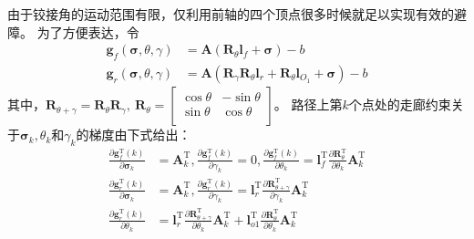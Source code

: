 \documentclass[master,academic]{ysuthesis} %
\begin{document}
		由于铰接角的运动范围有限，仅利用前轴的四个顶点很多时候就足以实现有效的避障。
		为了方便表达，令
		\begin{equation}
			\begin{aligned}
			\bm{g}_{f}\left( \bm{\sigma} ,\theta ,\gamma \right) &=\bm{A}\left( \bm{R}_{\theta}\bm{l}_f+\bm{\sigma} \right) -b\\
			\bm{g}_r\left( \bm{\sigma} ,\theta ,\gamma \right) &=\bm{A}\left( \bm{R}_{\gamma}\bm{R}_{\theta}\bm{l}_r+\bm{R}_{\theta}\bm{l}_{O_1}+\bm{\sigma} \right) -b
			\end{aligned}
		\end{equation}
		其中，$\bm{R}_{\theta +\gamma}=\bm{R}_{\theta}\bm{R}_{\gamma},\ \bm{R}_{\theta}=\left[ \begin{matrix}
			\cos\theta&		-\sin\theta\\
			\sin\theta&		\cos\theta\\
		\end{matrix} \right] $。
		路径上第$k$个点处的走廊约束关于$\bm{\sigma}_k,\theta_k$和$\gamma_k$的梯度由下式给出：
		\begin{equation}
			\begin{aligned}
			\frac{\partial \bm{g}_{f}^{\mathrm{T}}(k)}{\partial \bm{\sigma} _k}&=\bm{A}_{k}^{\mathrm{T}},\frac{\partial \bm{g}_{f}^{\mathrm{T}}(k)}{\partial \gamma _k}=0,\frac{\partial \bm{g}_{f}^{\mathrm{T}}(k)}{\partial \theta _k}=\bm{l}_{f}^{\mathrm{T}}\frac{\partial \bm{R}_{\theta}^{\mathrm{T}}}{\partial \theta _k}\bm{A}_{k}^{\mathrm{T}}\\
			\frac{\partial \bm{g}_{r}^{\mathrm{T}}(k)}{\partial \bm{\sigma} _k}&=\bm{A}_{k}^{\mathrm{T}},\frac{\partial \bm{g}_{r}^{\mathrm{T}}(k)}{\partial \gamma _k}=\bm{l}_{r}^{\mathrm{T}}\frac{\partial \bm{R}_{\theta +\gamma}^{\mathrm{T}}}{\partial \gamma _k}\bm{A}_{k}^{\mathrm{T}}\\
			\frac{\partial \bm{g}_{r}^{\mathrm{T}}(k)}{\partial \theta _k}&=\bm{l}_{r}^{\mathrm{T}}\frac{\partial \bm{R}_{\theta +\gamma}^{\mathrm{T}}}{\partial \theta _k}\bm{A}_{k}^{\mathrm{T}}+\bm{l}_{o1}^{\mathrm{T}}\frac{\partial \bm{R}_{\theta}^{\mathrm{T}}}{\partial \theta _k}\bm{A}_{k}^{\mathrm{T}}
			\end{aligned}
		\end{equation}
\end{document}
